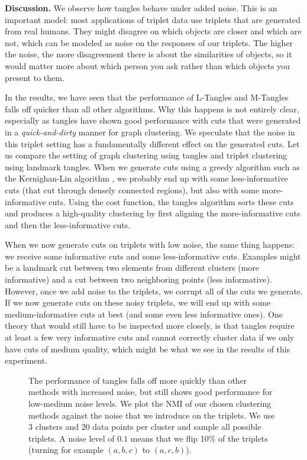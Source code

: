 \noindent
\textbf{Discussion.}
We observe how tangles behave under added noise. This is an important model: most applications of triplet data use triplets that are generated from
real humans. They might disagree on which objects are closer and which are not, which can be modeled as noise on the responses of our triplets. The higher the noise, 
the more disagreement there is about the similarities of objects, so it would matter more about which person you ask rather than which objects you present to them. 

In the results, we have seen that the performance of L-Tangles and M-Tangles falls off quicker than all other algorithms. Why this happens is not entirely clear, especially 
as tangles have shown good performance with cuts that were generated in a \textit{quick-and-dirty} manner for graph clustering.
We speculate that the noise in this triplet setting has a fundamentally different effect on the generated cuts. Let us compare the setting of
graph clustering using tangles and triplet clustering using landmark tangles. When we generate cuts using a greedy algorithm such as the Kernighan-Lin algorithm \citep{kernighanbrianwilsonEfficientHeuristicProcedure1970}, we probably end up with some less-informative cuts (that cut through densely connected regions), but also with some more-informative cuts. 
Using the cost function, the tangles algorithm sorts these cuts and produces a high-quality clustering by first aligning the more-informative cuts and then the less-informative cuts. 

When we now generate cuts on triplets with low noise, the same thing happens: we receive some informative cuts 
and some less-informative cuts. Examples might be a landmark cut between two elements from different clusters (more informative) and
a cut between two neighboring points (less informative). However, once we add noise to the triplets, we corrupt all of the cuts we generate. If we now generate cuts on these noisy triplets, we will 
end up with some medium-informative cuts at best (and some even less informative ones). 
One theory that would still have to be inspected more closely, is that tangles require at least a few very informative cuts and
cannot correctly cluster data if we only have cuts of medium quality, which might be what we see in the results of this experiment.


\begin{figure}[ht]
    \centering
    \resizebox{0.7\textwidth}{!}{}
    \caption{
        The performance of tangles falls off more quickly than other methods with increased noise, but still shows good performance for low-medium noise levels.
        We plot the NMI of our chosen clustering methods against the noise that we introduce on 
        the triplets.
        We use $3$ clusters and $20$ data points per cluster and sample all possible triplets. A noise level of $0.1$ means that we flip 10\% of the triplets (turning for example $(a,b,c)$ to $(a,c,b)$). 
    }
    \label{fig:adding-noise}
\end{figure}


